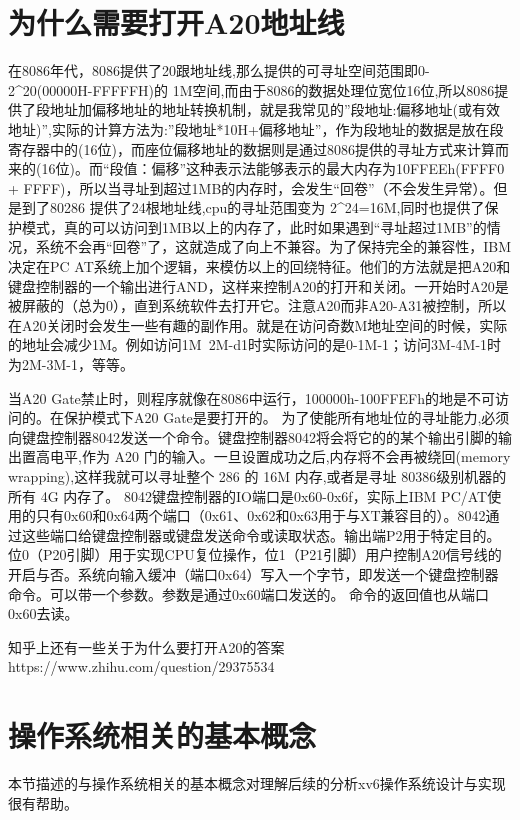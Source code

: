 \documentclass[a4paper,12pt]{report}
\begin{document}
\begin{appendix}
\chapter{为什么需要打开A20地址线}
\songti
\begin{spacing}{1.5}

    在8086年代，8086提供了20跟地址线,那么提供的可寻址空间范围即0-2\^{}20(00000H-FFFFFH)的 1M空间,而由于8086的数据处理位宽位16位,所以8086提供了段地址加偏移地址的地址转换机制，就是我常见的”段地址:偏移地址(或有效地址)”,实际的计算方法为:”段地址*10H+偏移地址”，作为段地址的数据是放在段寄存器中的(16位)，而座位偏移地址的数据则是通过8086提供的寻址方式来计算而来的(16位)。而“段值：偏移”这种表示法能够表示的最大内存为10FFEEh(FFFF0   +   FFFF)，所以当寻址到超过1MB的内存时，会发生“回卷”（不会发生异常）。但是到了80286 提供了24根地址线,cpu的寻址范围变为 2\^{}24=16M,同时也提供了保护模式，真的可以访问到1MB以上的内存了，此时如果遇到“寻址超过1MB”的情况，系统不会再“回卷”了，这就造成了向上不兼容。为了保持完全的兼容性，IBM决定在PC AT系统上加个逻辑，来模仿以上的回绕特征。他们的方法就是把A20和键盘控制器的一个输出进行AND，这样来控制A20的打开和关闭。一开始时A20是被屏蔽的（总为0），直到系统软件去打开它。注意A20而非A20-A31被控制，所以在A20关闭时会发生一些有趣的副作用。就是在访问奇数M地址空间的时候，实际的地址会减少1M。例如访问1M~2M-d1时实际访问的是0-1M-1；访问3M-4M-1时为2M-3M-1，等等。

    当A20 Gate禁止时，则程序就像在8086中运行，100000h-100FFEFh的地是不可访问的。在保护模式下A20 Gate是要打开的。
为了使能所有地址位的寻址能力,必须向键盘控制器8042发送一个命令。键盘控制器8042将会将它的的某个输出引脚的输出置高电平,作为 A20 门的输入。一旦设置成功之后,内存将不会再被绕回(memory wrapping),这样我就可以寻址整个 286 的 16M 内存,或者是寻址 80386级别机器的所有 4G 内存了。
8042键盘控制器的IO端口是0x60-0x6f，实际上IBM PC/AT使用的只有0x60和0x64两个端口（0x61、0x62和0x63用于与XT兼容目的）。8042通过这些端口给键盘控制器或键盘发送命令或读取状态。输出端P2用于特定目的。位0（P20引脚）用于实现CPU复位操作，位1（P21引脚）用户控制A20信号线的开启与否。系统向输入缓冲（端口0x64）写入一个字节，即发送一个键盘控制器命令。可以带一个参数。参数是通过0x60端口发送的。 命令的返回值也从端口 0x60去读。

知乎上还有一些关于为什么要打开A20的答案 https://www.zhihu.com/question/29375534

\end{spacing}

\chapter{操作系统相关的基本概念}
\songti
\begin{spacing}{1.5}
本节描述的与操作系统相关的基本概念对理解后续的分析xv6操作系统设计与实现很有帮助。
\end{spacing}



\end{appendix}
\end{document}
